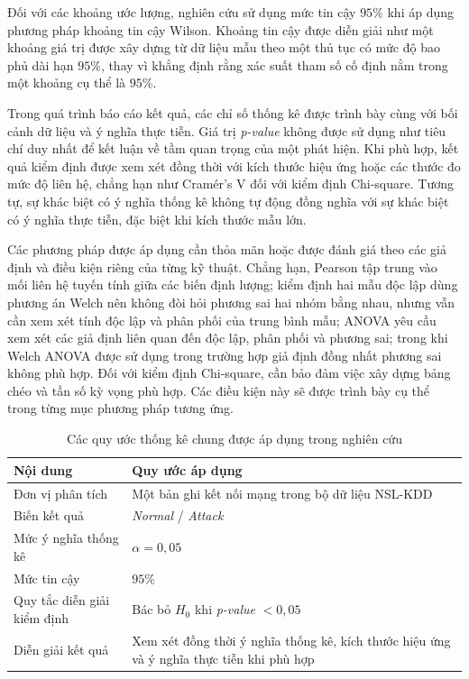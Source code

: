 \documentclass[../main.tex]{subfiles}
\begin{document}
Đối với các khoảng ước lượng, nghiên cứu sử dụng mức tin cậy $95\%$ khi áp dụng phương pháp khoảng tin cậy Wilson. Khoảng tin cậy được diễn giải như một khoảng giá trị được xây dựng từ dữ liệu mẫu theo một thủ tục có mức độ bao phủ dài hạn $95\%$, thay vì khẳng định rằng xác suất tham số cố định nằm trong một khoảng cụ thể là $95\%$.

Trong quá trình báo cáo kết quả, các chỉ số thống kê được trình bày cùng với bối cảnh dữ liệu và ý nghĩa thực tiễn. Giá trị \textit{p-value} không được sử dụng như tiêu chí duy nhất để kết luận về tầm quan trọng của một phát hiện. Khi phù hợp, kết quả kiểm định được xem xét đồng thời với kích thước hiệu ứng hoặc các thước đo mức độ liên hệ, chẳng hạn như Cramér's V đối với kiểm định Chi-square. Tương tự, sự khác biệt có ý nghĩa thống kê không tự động đồng nghĩa với sự khác biệt có ý nghĩa thực tiễn, đặc biệt khi kích thước mẫu lớn.

Các phương pháp được áp dụng cần thỏa mãn hoặc được đánh giá theo các giả định và điều kiện riêng của từng kỹ thuật. Chẳng hạn, Pearson tập trung vào mối liên hệ tuyến tính giữa các biến định lượng; kiểm định hai mẫu độc lập dùng phương án Welch nên không đòi hỏi phương sai hai nhóm bằng nhau, nhưng vẫn cần xem xét tính độc lập và phân phối của trung bình mẫu; ANOVA yêu cầu xem xét các giả định liên quan đến độc lập, phân phối và phương sai; trong khi Welch ANOVA được sử dụng trong trường hợp giả định đồng nhất phương sai không phù hợp. Đối với kiểm định Chi-square, cần bảo đảm việc xây dựng bảng chéo và tần số kỳ vọng phù hợp. Các điều kiện này sẽ được trình bày cụ thể trong từng mục phương pháp tương ứng.

\begin{table}[H]
\centering
\caption{Các quy ước thống kê chung được áp dụng trong nghiên cứu}
\label{tab:t1:convention}
\renewcommand{\arraystretch}{1.25}
\begin{tabularx}{\textwidth}{>{\raggedright\arraybackslash}p{} X}
\toprule
\textbf{Nội dung} & \textbf{Quy ước áp dụng} \\
\midrule
Đơn vị phân tích & Một bản ghi kết nối mạng trong bộ dữ liệu NSL-KDD \\
Biến kết quả & \textit{Normal} / \textit{Attack} \\
Mức ý nghĩa thống kê & $\alpha = 0{,}05$ \\
Mức tin cậy & $95\%$ \\
Quy tắc diễn giải kiểm định & Bác bỏ $H_0$ khi \textit{p-value} $< 0{,}05$ \\
Diễn giải kết quả & Xem xét đồng thời ý nghĩa thống kê, kích thước hiệu ứng và ý nghĩa thực tiễn khi phù hợp \\
\bottomrule
\end{tabularx}
\end{table}
\end{document}
